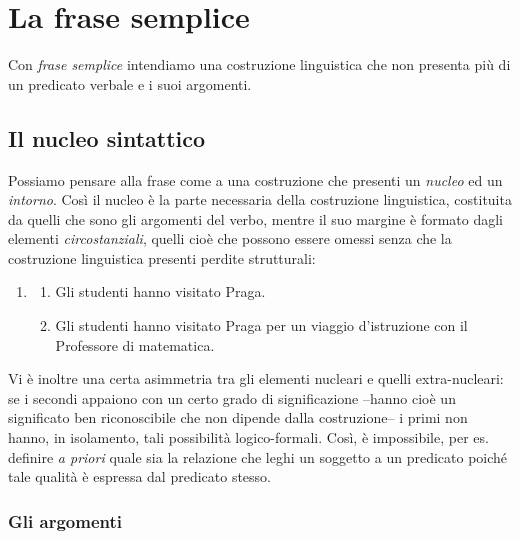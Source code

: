 \documentclass[
  a4paper,
  twoside,
  11pt,
  chapterprefix=false,
  bibliography=totocnumbered,
  listof=flat]{scrbook}
\providecommand{\tightlist}{%
  \setlength{\itemsep}{0pt}\setlength{\parskip}{0pt}}
\begin{document}
\hypertarget{la-frase-semplice}{%
\section{La frase semplice}\label{la-frase-semplice}}

Con \emph{frase semplice} intendiamo una costruzione linguistica che non presenta più di un predicato verbale e i suoi argomenti.

\hypertarget{il-nucleo-sintattico}{%
\subsection{Il nucleo sintattico}\label{il-nucleo-sintattico}}

Possiamo pensare alla frase come a una costruzione che presenti un \emph{nucleo} ed un \emph{intorno}.
Così il nucleo è la parte necessaria della costruzione linguistica, costituita da quelli che sono gli argomenti del verbo, mentre il suo margine è formato dagli elementi \emph{circostanziali}, quelli cioè che possono essere omessi senza che la costruzione linguistica presenti perdite strutturali:

\begin{enumerate}
\def\labelenumi{(\arabic{enumi})}
\setcounter{enumi}{11}
\item
  \begin{enumerate}
  \def\labelenumii{\alph{enumii}.}
  \tightlist
  \item
    Gli studenti hanno visitato Praga.
  \item
    Gli studenti hanno visitato Praga per un viaggio d'istruzione con il Professore di matematica.
  \end{enumerate}
\end{enumerate}

Vi è inoltre una certa asimmetria tra gli elementi nucleari e quelli extra-nucleari: se i secondi appaiono con un certo grado di significazione --hanno cioè un significato ben riconoscibile che non dipende dalla costruzione-- i primi non hanno, in isolamento, tali possibilità logico-formali. Così, è impossibile, per es. definire \emph{a priori} quale sia la relazione che leghi un soggetto a un predicato poiché tale qualità è espressa dal predicato stesso.

\hypertarget{gli-argomenti}{%
\subsubsection{Gli argomenti}\label{gli-argomenti}}
\end{document}
